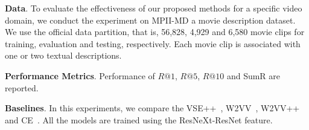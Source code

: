 \begin{table*} [tb!]
\renewcommand{\arraystretch}{1.2}
\caption{\textbf{Performance of Dual encoding with distinct common spaces}. Dataset: MSR-VTT.}
\label{tab:ablation-space}
\centering 
{}\end{table*}


\textbf{Data}. 
To evaluate the effectiveness of our proposed methods for a specific video domain, we conduct the experiment on MPII-MD \cite{rohrbach2015dataset} a movie description dataset.
We use the official data partition, that is, 56,828, 4,929 and 6,580 movie clips for training, evaluation and testing, respectively. 
Each movie clip is associated with one or two textual descriptions.

\textbf{Performance Metrics}. 
Performance of $R@1$, $R@5$, $R@10$ and SumR are reported.

\textbf{Baselines}. In this experiments, we compare the VSE++~\cite{faghri2017vse}, W2VV~\cite{dong2018predicting}, W2VV++~\cite{li2019w2vv++} and CE~\cite{liu2019use}. All the models are trained using the  ResNeXt-ResNet feature.


